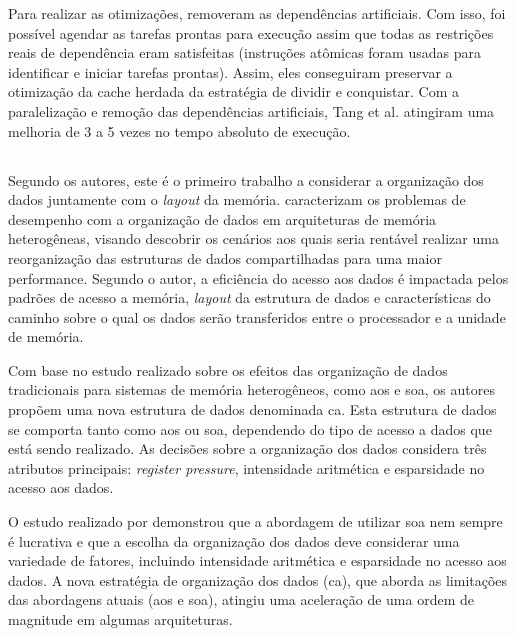 Para realizar as otimizações,  removeram as dependências artificiais. Com isso, foi possível agendar as tarefas prontas para execução assim que todas as restrições reais de dependência eram satisfeitas (instruções atômicas foram usadas para identificar e iniciar tarefas prontas). Assim, eles conseguiram preservar a otimização da cache herdada da estratégia de dividir e conquistar.
Com a paralelização e remoção das dependências artificiais, Tang et al. atingiram uma melhoria de 3 a 5 vezes no tempo absoluto de execução.

\subsection{}


Segundo os autores, este é o primeiro trabalho a considerar a organização dos dados juntamente com o \textit{layout} da memória.
 caracterizam os problemas de desempenho com a organização de dados em arquiteturas de memória heterogêneas, visando descobrir os cenários aos quais seria rentável realizar uma reorganização das estruturas de dados compartilhadas para uma maior performance.
Segundo o autor, a eficiência do acesso aos dados é impactada pelos padrões de acesso a memória, \textit{layout} da estrutura de dados e características do caminho sobre o qual os dados serão transferidos entre o processador e a unidade de memória.

Com base no estudo realizado sobre os efeitos das organização de dados tradicionais para sistemas de memória heterogêneos, como \ac{aos} e \ac{soa}, os autores propõem uma nova estrutura de dados denominada \ac{ca}.
Esta estrutura de dados se comporta tanto como \ac{aos} ou \ac{soa}, dependendo do tipo de acesso a dados que está sendo realizado.
As decisões sobre a organização dos dados considera três atributos principais: \textit{register pressure}, intensidade aritmética e esparsidade no acesso aos dados.

O estudo realizado por  demonstrou que a abordagem de utilizar \ac{soa} nem sempre é lucrativa e que a escolha da organização dos dados deve considerar uma variedade de fatores, incluindo intensidade aritmética e esparsidade no acesso aos dados.
A nova estratégia de organização dos dados (\ac{ca}), que aborda as limitações das abordagens atuais (\ac{aos} e \ac{soa}), atingiu uma aceleração de uma ordem de magnitude em algumas arquiteturas.

